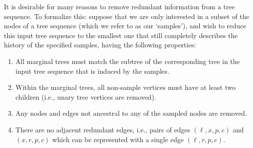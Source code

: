 \documentclass{article}
\begin{document}
It is desirable for many reasons to remove redundant information from a tree sequence.
To formalize this:
suppose that we are only interested in a subset of the nodes of a tree sequence
(which we refer to as our `samples'),
and wish to reduce this input tree sequence
to the smallest one that still completely describes the history of the specified samples,
having the following properties:
\begin{enumerate}

\item All marginal trees must match the subtree
        of the corresponding tree in the input tree sequence
        that is induced by the samples.

\item Within the marginal trees, all non-sample vertices must have at least
        two children (i.e., unary tree vertices are removed).

\item Any nodes and edges not ancestral to any of the sampled nodes are removed.

\item There are no adjacent redundant edges, i.e., pairs of edges
    $(\ell, x, p, c)$ and $(x, r, p, c)$ which can be represented with a single edge
    $(\ell, r, p, c)$.

\end{enumerate}
\end{document}
